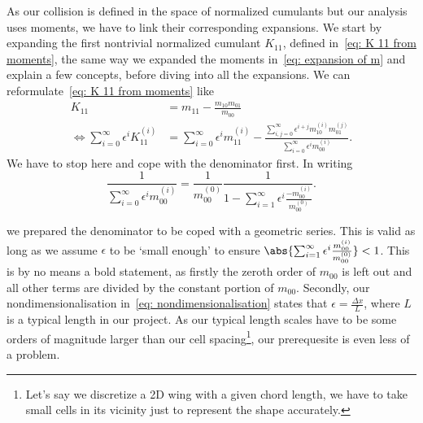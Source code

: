 As our collision is defined in the space of normalized cumulants but our analysis uses moments, we have to link their corresponding expansions.
We start by expanding the first nontrivial normalized cumulant $K_{11}$, defined in~\eqref{eq: K 11 from moments}, the same way we expanded the moments in~\eqref{eq: expansion of m} and explain a few concepts, before diving into all the expansions.
We can reformulate~\eqref{eq: K 11 from moments} like
\begin{equation}
  \label{eq: first expansion}
  \begin{aligned}
    K_{11} & = m_{11} - \frac{m_{10}m_{01}}{m_{00}}\\
    \Leftrightarrow
    \sum_{i=0}^\infty \epsilon^i K_{11}^{(i)}
    & = \sum_{i=0}^\infty \epsilon^i m_{11}^{(i)} -
    \frac{\sum_{i,j=0}^\infty \epsilon^{i+j} m_{10}^{(i)}m_{01}^{(j)}}
        {\sum_{i=0}^\infty \epsilon^i m_{00}^{(i)}}.
  \end{aligned}
\end{equation}
We have to stop here and cope with the denominator first.
In writing
\begin{equation}
  \frac{1}{\sum_{i=0}^\infty \epsilon^i m_{00}^{(i)}}=
  \frac{1}{m_{00}^{(0)}}
  \frac{1}{1 - \sum_{i=1}^\infty \epsilon^i \frac{ - m_{00}^{(i)}}{ m_{00}^{(0)}}}.
\end{equation}

we prepared the denominator to be coped with a geometric series.
This is valid as long as we assume $\epsilon$ to be `small enough' to ensure $\abs{\sum_{i=1}^\infty \epsilon^i \frac{ m_{00}^{(i)}}{ m_{00}^{(0)}} } < 1$.
This is by no means a bold statement, as firstly the zeroth order of $m_{00}$ is left out and all other terms are divided by the constant portion of $m_{00}$.
Secondly, our nondimensionalisation in~\eqref{eq: nondimensionalisation} states that $\epsilon = \frac{\Delta x}{L}$, where $L$ is a typical length in our project.
As our typical length scales have to be some orders of magnitude larger than our cell spacing\footnote{Let's say we discretize a 2D wing with a given chord length, we have to take small cells in its vicinity just to represent the shape accurately.}, our prerequesite is even less of a problem.

